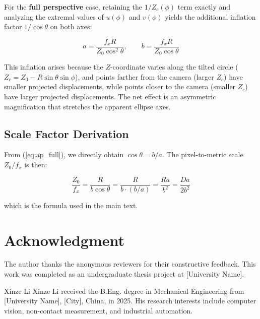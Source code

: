 \documentclass[journal]{IEEEtran}
\begin{document}
For the \textbf{full perspective} case, retaining the $1/Z_c(\phi)$ term
exactly and analyzing the extremal values of $u(\phi)$ and $v(\phi)$ yields
the additional inflation factor $1/\cos\theta$ on both axes:

\begin{equation}
a = \frac{f_x R}{Z_0 \cos^2\theta}, \qquad
b = \frac{f_x R}{Z_0 \cos\theta}
\label{eq:ap_full}
\end{equation}

This inflation arises because the $Z$-coordinate varies along the tilted
circle ($Z_c = Z_0 - R\sin\theta\sin\phi$), and points farther from the camera
(larger $Z_c$) have smaller projected displacements, while points closer to
the camera (smaller $Z_c$) have larger projected displacements. The net effect
is an asymmetric magnification that stretches the apparent ellipse axes.

\subsection*{Scale Factor Derivation}

From (\ref{eq:ap_full}), we directly obtain $\cos\theta = b/a$. The
pixel-to-metric scale $Z_0/f_x$ is then:

\begin{equation}
\frac{Z_0}{f_x} = \frac{R}{b \cos\theta}
                = \frac{R}{b \cdot (b/a)}
                = \frac{R a}{b^2}
                = \frac{D a}{2 b^2}
\label{eq:ap_scale}
\end{equation}

which is the formula used in the main text.

\section*{Acknowledgment}

The author thanks the anonymous reviewers for their constructive feedback.
This work was completed as an undergraduate thesis project at [University Name].





\begin{IEEEbiographynophoto}{Xinze Li}
Xinze Li received the B.Eng. degree in Mechanical Engineering from
[University Name], [City], China, in 2025. His research interests include
computer vision, non-contact measurement, and industrial automation.
\end{IEEEbiographynophoto}
\end{document}
